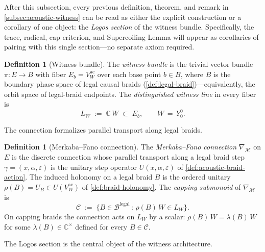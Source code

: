 \documentclass[11pt,a4paper]{article}
\theoremstyle{plain}
\theoremstyle{definition}
\newtheorem{definition}[theorem]{Definition}
\theoremstyle{remark}
\numberwithin{equation}{section}
\newcommand{\Complex}{\mathbb{C}}
\begin{document}
After this subsection, every previous definition, theorem, and
remark in \cref{subsec:acoustic-witness} can be read as either
the explicit construction or a corollary of one object: the
\emph{Logos section} of the witness bundle.  Specifically, the
trace, radical, cap criterion, and Supercoiling Lemma will appear
as corollaries of pairing with this single section---no separate
axiom required.

\begin{definition}[Witness bundle]
\label{def:witness-bundle}
The \emph{witness bundle} is the trivial vector bundle
$\pi\colon E\to B$ with fiber $E_b=V_W^{\mathrm{ac}}$ over each
base point $b\in B$, where $B$ is the boundary phase space of legal
causal braids (\cref{def:legal-braid})---equivalently, the orbit
space of legal-braid endpoints.  The \emph{distinguished witness
line} in every fiber is
\[
  L_W\;:=\;\Complex\,W\;\subset\;E_b,\qquad W\,=\,Y_0^0.
\]
\end{definition}

\medskip\noindent The connection formalizes parallel transport along legal braids.

\begin{definition}[Merkaba--Fano connection]
\label{def:mf-connection}
The \emph{Merkaba--Fano connection} $\nabla_{\mathcal{M}}$ on $E$
is the discrete connection whose parallel transport along a legal
braid step $\gamma=(x,\alpha,\varepsilon)$ is the unitary step
operator $U(x,\alpha,\varepsilon)$ of
\cref{def:acoustic-braid-action}.  The induced holonomy on a legal
braid $B$ is the ordered unitary
$\rho(B)=U_B\in U(V_W^{\mathrm{ac}})$ of \cref{def:braid-holonomy}.
The \emph{capping submonoid} of $\nabla_{\mathcal{M}}$ is
\[
  \mathcal{C}
  \;:=\;\bigl\{B\in\mathcal{B}^{\mathrm{legal}}\,:\,
        \rho(B)\,W\in L_W\bigr\}.
\]
On capping braids the connection acts on $L_W$ by a scalar:
$\rho(B)\,W=\lambda(B)\,W$ for some $\lambda(B)\in\Complex^{\times}$
defined for every $B\in\mathcal{C}$.
\end{definition}

\medskip\noindent The Logos section is the central object of the witness architecture.
\end{document}
